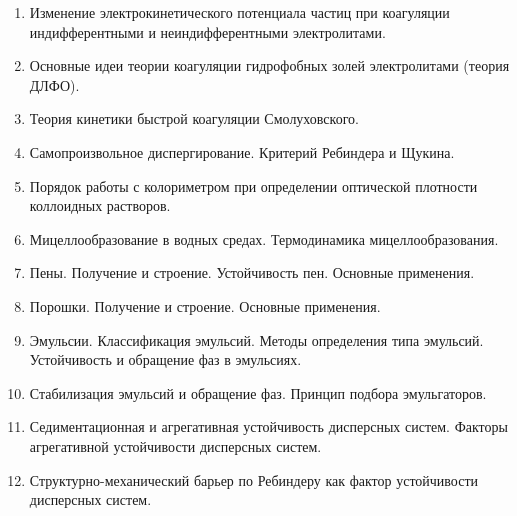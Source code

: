 \begin{enumerate}
\item 
Изменение электрокинетического потенциала частиц при коагуляции индифферентными и неиндифферентными электролитами. 
 
\item 
Основные идеи теории коагуляции гидрофобных золей электролитами (теория ДЛФО). 
 
\item 
Теория кинетики быстрой коагуляции Смолуховского.
 
\item 
Самопроизвольное диспергирование. Критерий Ребиндера и Щукина.
 
%
\item 
Порядок работы с колориметром при определении оптической плотности коллоидных растворов.
 
\item 
Мицеллообразование в водных средах. Термодинамика мицеллообразования.
 
\item 
Пены. Получение и строение. Устойчивость пен. Основные применения.
 
\item 
Порошки. Получение и строение. Основные применения.
 
\item 
Эмульсии. Классификация эмульсий. Методы определения типа эмульсий. Устойчивость и обращение фаз в эмульсиях.
 
\item 
Стабилизация эмульсий и обращение фаз. Принцип подбора эмульгаторов. 
 
\item 
Седиментационная и агрегативная устойчивость дисперсных систем. Факторы агрегативной устойчивости дисперсных систем.
 
\item 
Структурно-механический барьер по Ребиндеру как фактор устойчивости дисперсных систем.
 

\end{enumerate}